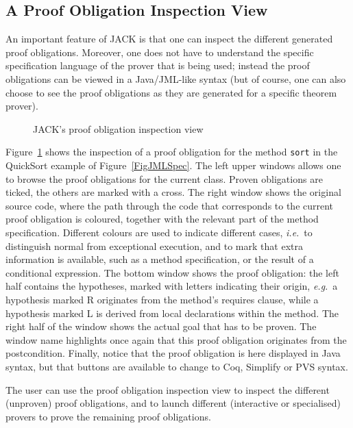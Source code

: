\subsection{A Proof Obligation Inspection View}

An important feature of JACK is that one can inspect the different
generated proof obligations. Moreover, one does not have to understand
the specific specification language of the prover that is being used;
instead the proof obligations can be viewed in a Java/JML-like syntax
(but of course, one can also choose to see the proof obligations as
they are generated for a specific theorem prover).

\begin{figure}[t!]
\caption{JACK's proof obligation inspection view}\label{FigJackView}
\end{figure}


Figure~\ref{FigJackView} shows the inspection of a proof obligation
for the method \texttt{sort} in the QuickSort example of
Figure~\ref{FigJMLSpec}. The left upper windows allows one to browse
the proof obligations for the current class. Proven obligations are
ticked, the others are marked with a cross. The right window shows the
original source code, where the path through the code that corresponds
to the current proof obligation is coloured, together with the
relevant part of the method specification. Different colours are used
to indicate different cases, \emph{i.e.}\ to distinguish normal from
exceptional execution, and to mark that extra information is
available, such as a method specification, or the result of a
conditional expression.  The bottom window shows the proof obligation:
the left half contains the hypotheses, marked with letters indicating
their origin, \emph{e.g.}\ a hypothesis marked R originates from the
method's requires clause, while a hypothesis marked L is derived from
local declarations within the method. The right half of the window
shows the actual goal that has to be proven. The window name
highlights once again that this proof obligation originates from the
postcondition. Finally, notice that the proof obligation is here
displayed in Java syntax, but that buttons are available to change to
Coq, Simplify or PVS syntax.


The user can use the proof obligation inspection view to inspect the
different (unproven) proof obligations, and to launch different
(interactive or specialised) provers to prove the remaining proof
obligations.


